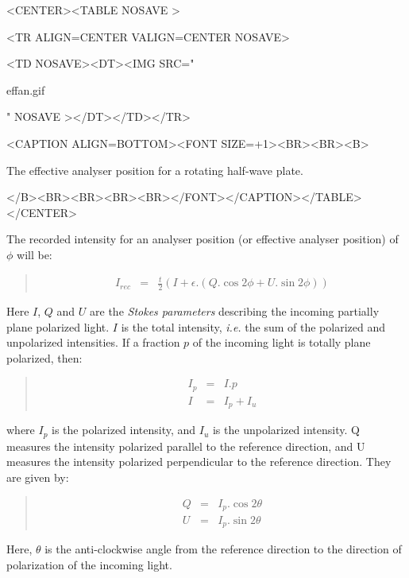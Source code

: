 \documentclass[twoside,11pt]{article}
\renewcommand{\_}{\texttt{\symbol{95}}}
\newcommand{\htmlfig}[3]{
   \label{#1}
   \begin{rawhtml} <CENTER><TABLE NOSAVE > \end{rawhtml}
   \begin{rawhtml} <TR ALIGN=CENTER VALIGN=CENTER NOSAVE> \end{rawhtml}
   \begin{rawhtml} <TD NOSAVE><DT><IMG SRC=" \end{rawhtml}
   #2
   \begin{rawhtml} " NOSAVE ></DT></TD></TR> \end{rawhtml}
   \begin{rawhtml} <CAPTION ALIGN=BOTTOM><FONT SIZE=+1><BR><BR><B> \end{rawhtml}
   #3 
   \begin{rawhtml} </B><BR><BR><BR><BR></FONT></CAPTION></TABLE></CENTER> \end{rawhtml}
}
\newenvironment{myquote}{\begin{quote}\begin{small}}{\end{small}\end{quote}}
\begin{document}
\begin{htmlonly}
\htmlfig{fig:effan}{effan.gif}{
The effective analyser position for a rotating half-wave plate.}
\end{htmlonly}

The recorded intensity for an analyser position (or effective analyser 
position) of $\phi$ will be:

\begin{myquote}
\begin{eqnarray}
\label{EQN:IREC}
  I_{rec} & = & \frac{t}{2}( I + \epsilon.( Q.\cos 2\phi + U.\sin 2\phi ) )
\end{eqnarray}
\end{myquote}

Here $I$, $Q$ and $U$ are the \emph{Stokes parameters} describing the
incoming partially plane polarized light. $I$ is the total intensity,
\emph{i.e.} the sum of the polarized and unpolarized intensities. If a
fraction $p$ of the incoming light is totally plane polarized, then:

\begin{myquote}
\begin{eqnarray*}
  I_{p} & = & I.p \\
  I & = & I_{p} + I_{u} 
\end{eqnarray*}
\end{myquote}

where $I_{p}$ is the polarized intensity, and $I_{u}$ is the unpolarized
intensity. Q measures the intensity polarized parallel to the reference
direction, and U measures the intensity polarized perpendicular to the 
reference direction. They are given by:

\begin{myquote}
\begin{eqnarray*}
  Q & = & I_{p}.\cos 2\theta \\
  U & = & I_{p}.\sin 2\theta
\end{eqnarray*}
\end{myquote}

Here, $\theta$ is the anti-clockwise angle from the reference direction to 
the direction of polarization of the incoming light.
\end{document}
